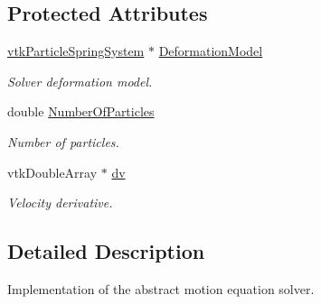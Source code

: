 \subsection*{Protected Attributes}
\begin{DoxyCompactItemize}
\item 
\hypertarget{classvtkMotionEquationSolver_ac73806d77961527fa8275ed48c8bfe43}{
\hyperlink{classvtkParticleSpringSystem}{vtkParticleSpringSystem} $\ast$ \hyperlink{classvtkMotionEquationSolver_ac73806d77961527fa8275ed48c8bfe43}{DeformationModel}}
\label{classvtkMotionEquationSolver_ac73806d77961527fa8275ed48c8bfe43}

\begin{DoxyCompactList}\small\item\em Solver deformation model. \item\end{DoxyCompactList}\item 
\hypertarget{classvtkMotionEquationSolver_a997ac5eb3fbb7b67ef2834a271d4cdd9}{
double \hyperlink{classvtkMotionEquationSolver_a997ac5eb3fbb7b67ef2834a271d4cdd9}{NumberOfParticles}}
\label{classvtkMotionEquationSolver_a997ac5eb3fbb7b67ef2834a271d4cdd9}

\begin{DoxyCompactList}\small\item\em Number of particles. \item\end{DoxyCompactList}\item 
\hypertarget{classvtkMotionEquationSolver_a9c084cdaf3d799f15d8ba1d0ecbc28e9}{
vtkDoubleArray $\ast$ \hyperlink{classvtkMotionEquationSolver_a9c084cdaf3d799f15d8ba1d0ecbc28e9}{dv}}
\label{classvtkMotionEquationSolver_a9c084cdaf3d799f15d8ba1d0ecbc28e9}

\begin{DoxyCompactList}\small\item\em Velocity derivative. \item\end{DoxyCompactList}\end{DoxyCompactItemize}


\subsection{Detailed Description}
Implementation of the abstract motion equation solver. 

